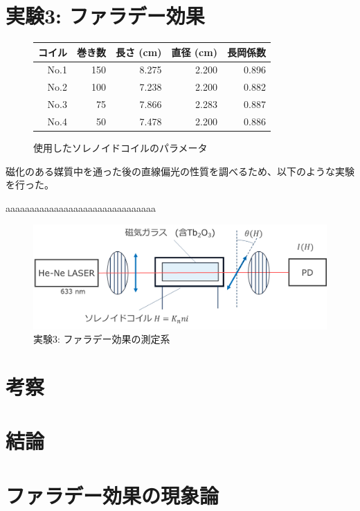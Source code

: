 \documentclass[9pt,dvipdfmx,a4paper]{jsarticle}
\begin{document}
\section{実験3: ファラデー効果}
\begin{figure}
    \centering
    \caption{使用したソレノイドコイルのパラメータ}
    \label{table:ex-3}
    \begin{tabular}{rrrrr}
        \hline
        コイル & 巻き数 & 長さ (cm) & 直径 (cm) & 長岡係数\\
        \hline
        No.1 & 150 & 8.275 & 2.200 & 0.896\\
        No.2 & 100 & 7.238 & 2.200 & 0.882\\
        No.3 & 75 & 7.866 & 2.283 & 0.887\\
        No.4 & 50 & 7.478 & 2.200 & 0.886\\
        \hline
    \end{tabular}
\end{figure}

磁化のある媒質中を通った後の直線偏光の性質を調べるため、以下のような実験を行った。

aaaaaaaaaaaaaaaaaaaaaaaaaaaaaaa

\begin{figure}
    \centering
    \includegraphics[width=0.8\columnwidth]{fig_ex-3.png}
    \caption{実験3: ファラデー効果の測定系}
    \label{fig:ex-3}
\end{figure}


\section{考察}

\section{結論}



\nocite{*}
\appendix
\section{ファラデー効果の現象論}
\end{document}
